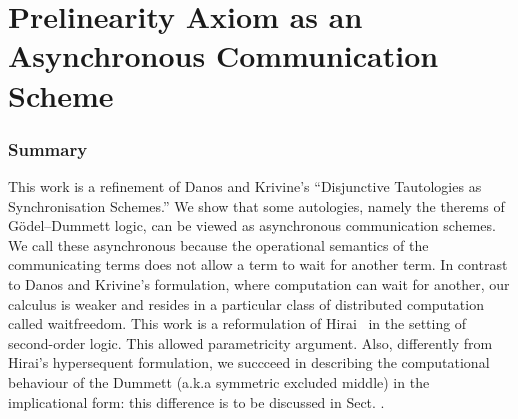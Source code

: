 \chapter{Prelinearity Axiom as an
  Asynchronous Communication Scheme}




% 


\newcommand{\ltypes}[1]{\mathsf{Ltypes}({#1})}
\newcommand{\lvars}[1]{\mathsf{Lvars}({#1})}
\newcommand{\rtypes}[1]{\mathsf{Rtypes}({#1})}
\newcommand{\rterms}[1]{\mathsf{Rterms}({#1})}

\renewcommand{\vec}{\overrightarrow}
\subsection{Summary}
This work is a refinement of
Danos and Krivine's ``Disjunctive Tautologies as
Synchronisation Schemes.''
We show that some autologies,
namely the therems of G\"odel--Dummett logic,
can be viewed as asynchronous communication schemes.
We call these asynchronous because the operational semantics
of the communicating terms does not allow a term to wait for another
term.
In contrast to Danos and Krivine's  formulation,
where computation can wait for another,
our calculus is weaker and resides in a particular class of
distributed computation called waitfreedom.
This work is a reformulation of Hirai~ in the setting of
second-order logic.
This allowed parametricity argument.
Also, differently from Hirai's  hypersequent formulation,
we succceed in describing the computational behaviour of the Dummett
(a.k.a symmetric excluded middle) in the implicational form: this
difference is to be discussed in Sect. .




